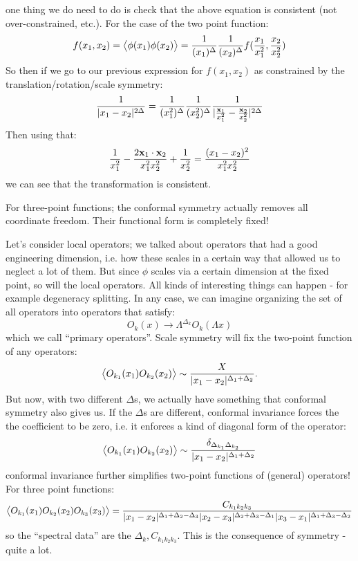 one thing we do need to do is check that the above equation is consistent (not over-constrained, etc.). For the case of the two point function:
\begin{equation}
    f(x_1, x_2) = \avg{\phi(x_1)\phi(x_2)} = \frac{1}{(x_1)^\Delta}\frac{1}{(x_2)^\Delta}f(\frac{x_1}{x_1^2}, \frac{x_2}{x_2^2})
\end{equation}
So then if we go to our previous expression for $f(x_1, x_2)$ as constrained by the translation/rotation/scale symmetry:
\begin{equation}
    \frac{1}{\lvert x_1 - x_2 \rvert^{2\Delta}} = \frac{1}{(x_1^2)^\Delta}\frac{1}{(x_2^2)^\Delta}\frac{1}{\lvert \frac{\mathbf{x}_1}{x_1^2} - \frac{\mathbf{x}_2}{x_2^2} \rvert^{2\Delta}}
\end{equation}
Then using that:
\begin{equation}
    \frac{1}{x_1^2} - \frac{2\mathbf{x}_1 \cdot \mathbf{x}_2}{x_1^2x_2^2} + \frac{1}{x_2^2} = \frac{(x_1 - x_2)^2}{x_1^2x_2^2}
\end{equation}
we can see that the transformation is consistent. 

For three-point functions; the conformal symmetry actually removes all coordinate freedom. Their functional form is completely fixed!

Let's consider local operators; we talked about operators that had a good engineering dimension, i.e. how these scales in a certain way that allowed us to neglect a lot of them. But since $\phi$ scales via a certain dimension at the fixed point, so will the local operators. All kinds of interesting things can happen - for example degeneracy splitting. In any case, we can imagine organizing the set of all operators into operators that satisfy:
\begin{equation}
    O_k(x) \to \Lambda^{\Delta_k}O_k(\Lambda x)
\end{equation}
which we call ``primary operators''. Scale symmetry will fix the two-point function of any operators:
\begin{equation}
    \left< O_{k_1}(x_1)O_{k_2}(x_2) \right> \sim \frac{X}{\lvert x_1 - x_2 \rvert^{\Delta_1 + \Delta_2}}.
\end{equation}
But now, with two different $\Delta$s, we actually have something that conformal symmetry also gives us. If the $\Delta$s are different, conformal invariance forces the the coefficient to be zero, i.e. it enforces a kind of diagonal form of the operator:
\begin{equation}
    \left< O_{k_1}(x_1)O_{k_2}(x_2) \right> \sim \frac{\delta_{\Delta_{k_1}\Delta_{k_2}}}{\lvert x_1 - x_2 \rvert^{\Delta_1 + \Delta_2}}
\end{equation}
conformal invariance further simplifies two-point functions of (general) operators! For three point functions:
\begin{equation}
    \left< O_{k_1}(x_1)O_{k_2}(x_2)O_{k_3}(x_3) \right> = \frac{C_{k_1k_2k_3}}{\lvert x_1 - x_2 \rvert^{\Delta_1 + \Delta_2 - \Delta_3}\lvert x_2-x_3 \rvert^{\Delta_2 + \Delta_3 - \Delta_1}\lvert x_3 - x_1 \rvert^{\Delta_1 + \Delta_3 - \Delta_2}}
\end{equation}
so the ``spectral data'' are the $\Delta_k, C_{k_1k_2k_3}$. This is the consequence of symmetry - quite a lot.

